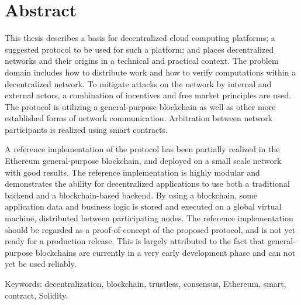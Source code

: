 
\thispagestyle{plain}			%
\section*{Abstract}
This thesis describes a basis for decentralized cloud computing platforms; a suggested protocol to be used for such a platform; and places decentralized networks and their origins in a technical and practical context. The problem domain includes how to distribute work and how to verify computations within a decentralized network. To mitigate attacks on the network by internal and external actors, a combination of incentives and free market principles are used. The protocol is utilizing a general-purpose blockchain as well as other more established forms of network communication. Arbitration between network participants is realized using smart contracts.

A reference implementation of the protocol has been partially realized in the Ethereum general-purpose blockchain, and deployed on a small scale network with good results. The reference implementation is highly modular and demonstrates the ability for decentralized applications to use both a traditional backend and a blockchain-based backend. By using a blockchain, some application data and business logic is stored and executed on a global virtual machine, distributed between participating nodes. The reference implementation should be regarded as a proof-of-concept of the proposed protocol, and is not yet ready for a production release. This is largely attributed to the fact that general-purpose blockchains are currently in a very early development phase and can not yet be used reliably.


\vfill
\noindent Keywords: decentralization, blockchain, trustless, consensus, Ethereum, smart, \\contract, Solidity. 

\newpage				%
\thispagestyle{empty}
\mbox{}